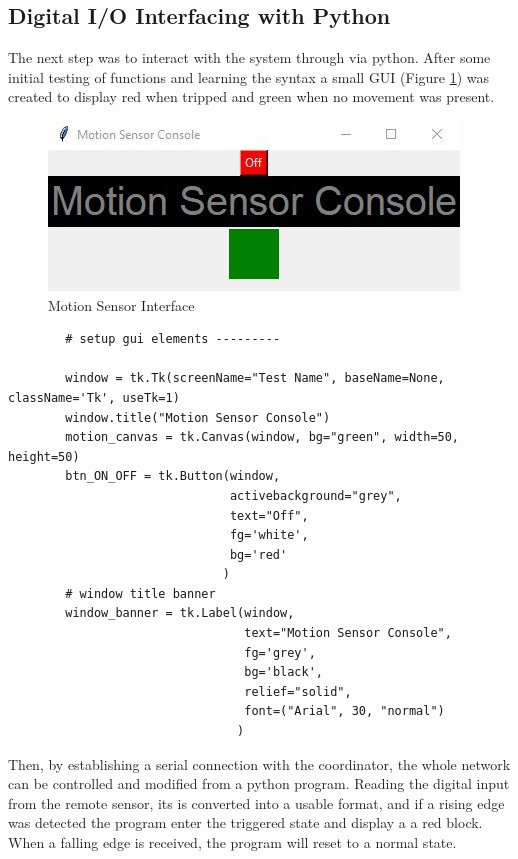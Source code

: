 	\subsection{Digital I/O Interfacing with Python}
	The next step was to interact with the system through via python. After some initial testing of functions and learning the syntax a small GUI (Figure \ref{fig:motGui}) was created to display red when tripped and green when no movement was present. 
	\begin{figure}[h]
		\centering
		\includegraphics[width=0.5\linewidth]{motionGui.jpg}
		\caption{Motion Sensor Interface}
		\label{fig:motGui}
	\end{figure}
\newpage
	\begin{lstlisting}
		# setup gui elements ---------
		
		window = tk.Tk(screenName="Test Name", baseName=None, className='Tk', useTk=1)
		window.title("Motion Sensor Console")
		motion_canvas = tk.Canvas(window, bg="green", width=50, height=50)
		btn_ON_OFF = tk.Button(window,
							   activebackground="grey",
							   text="Off",
							   fg='white',
							   bg='red'
							  )
		# window title banner
		window_banner = tk.Label(window,
								 text="Motion Sensor Console",
								 fg='grey',
								 bg='black',
								 relief="solid",
								 font=("Arial", 30, "normal")
								)
	\end{lstlisting}
		Then, by establishing a serial connection with the coordinator, the whole network can be controlled and modified from a python program. Reading the digital input from the remote sensor, its is converted into a usable format, and if a rising edge was detected the program enter the triggered state and display a a red block. When a falling edge is received, the program will reset to a normal state. 
